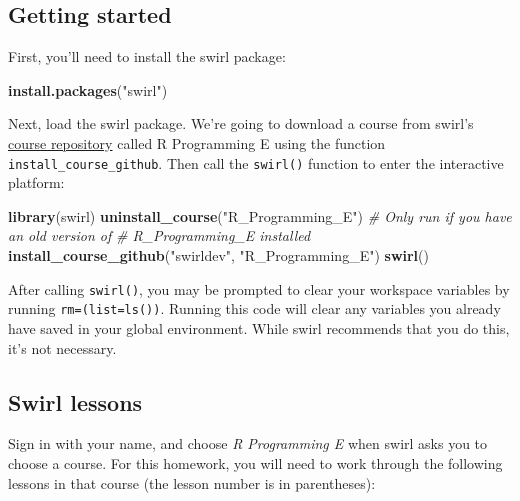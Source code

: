 \documentclass[]{book}
\makeatletter
\newenvironment{Shaded}{\begin{snugshade}}{\end{snugshade}}
\newcommand{\KeywordTok}[1]{\textcolor[rgb]{0.13,0.29,0.53}{\textbf{#1}}}
\newcommand{\StringTok}[1]{\textcolor[rgb]{0.31,0.60,0.02}{#1}}
\newcommand{\CommentTok}[1]{\textcolor[rgb]{0.56,0.35,0.01}{\textit{#1}}}
\newcommand{\NormalTok}[1]{#1}
\newenvironment{kframe}{%
\medskip{}
\setlength{\fboxsep}{.8em}
 \def\at@end@of@kframe{}%
 \ifinner\ifhmode%
  \def\at@end@of@kframe{\end{minipage}}%
  \begin{minipage}{\columnwidth}%
 \fi\fi%
 \def\FrameCommand##1{\hskip\@totalleftmargin \hskip-\fboxsep
 \colorbox{shadecolor}{##1}\hskip-\fboxsep
     \hskip-\linewidth \hskip-\@totalleftmargin \hskip\columnwidth}%
 \MakeFramed {\advance\hsize-\width
   \@totalleftmargin\z@ \linewidth\hsize
   \@setminipage}}%
 {\par\unskip\endMakeFramed%
 \at@end@of@kframe}
\renewenvironment{Shaded}{\begin{kframe}}{\end{kframe}}
\newenvironment{rmdblock}[1]
  {
  \begin{itemize}
  \renewcommand{\labelitemi}{
    \raisebox{-.7\height}[0pt][0pt]{
      {\setkeys{Gin}{width=3em,keepaspectratio}\texttt{[image: images/\#1]}}
    }
  }
  \setlength{\fboxsep}{1em}
  \begin{kframe}
  \item
  }
  {
  \end{kframe}
  \end{itemize}
  }
\newenvironment{rmdnote}
  {\begin{rmdblock}{note}}
  {\end{rmdblock}}
\theoremstyle{definition}
\theoremstyle{definition}
\theoremstyle{definition}
\theoremstyle{remark}
\makeatother
\begin{document}
\subsection{Getting started}\label{getting-started}

First, you'll need to install the swirl package:

\begin{Shaded}
\begin{Highlighting}[]
\KeywordTok{install.packages}\NormalTok{(}\StringTok{"swirl"}\NormalTok{)}
\end{Highlighting}
\end{Shaded}

Next, load the swirl package. We're going to download a course from
swirl's \href{https://github.com/swirldev/swirl_courses}{course
repository} called R Programming E using the function
\texttt{install\_course\_github}. Then call the \texttt{swirl()}
function to enter the interactive platform:

\begin{Shaded}
\begin{Highlighting}[]
\KeywordTok{library}\NormalTok{(swirl)}
\KeywordTok{uninstall_course}\NormalTok{(}\StringTok{"R_Programming_E"}\NormalTok{) }\CommentTok{# Only run if you have an old version of}
                                    \CommentTok{# R_Programming_E installed}
\KeywordTok{install_course_github}\NormalTok{(}\StringTok{"swirldev"}\NormalTok{, }\StringTok{"R_Programming_E"}\NormalTok{)}
\KeywordTok{swirl}\NormalTok{()}
\end{Highlighting}
\end{Shaded}

\begin{rmdnote}
After calling \texttt{swirl()}, you may be prompted to clear your
workspace variables by running \texttt{rm=(list=ls())}. Running this
code will clear any variables you already have saved in your global
environment. While swirl recommends that you do this, it's not
necessary.
\end{rmdnote}

\subsection{Swirl lessons}\label{swirl-lessons}

Sign in with your name, and choose \emph{R Programming E} when swirl
asks you to choose a course. For this homework, you will need to work
through the following lessons in that course (the lesson number is in
parentheses):
\end{document}
